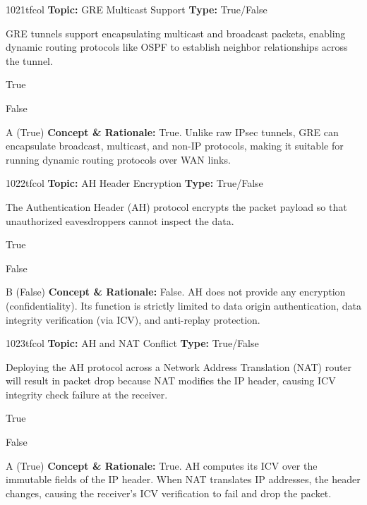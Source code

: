 \begin{qcard}{1021}{tfcol}
\textcolor{darkslate!75}{\small\textbf{Topic:} GRE Multicast Support \hfill \textbf{Type:} True/False}\vspace{0.4em}\par
GRE tunnels support encapsulating multicast and broadcast packets, enabling dynamic routing protocols like OSPF to establish neighbor relationships across the tunnel.
\begin{qoptions}
\item True
\item False
\end{qoptions}
\end{qcard}
\nopagebreak
\begin{explainbox}{A (True)}
\textbf{Concept \& Rationale:} True. Unlike raw IPsec tunnels, GRE can encapsulate broadcast, multicast, and non-IP protocols, making it suitable for running dynamic routing protocols over WAN links.
\end{explainbox}

\begin{qcard}{1022}{tfcol}
\textcolor{darkslate!75}{\small\textbf{Topic:} AH Header Encryption \hfill \textbf{Type:} True/False}\vspace{0.4em}\par
The Authentication Header (AH) protocol encrypts the packet payload so that unauthorized eavesdroppers cannot inspect the data.
\begin{qoptions}
\item True
\item False
\end{qoptions}
\end{qcard}
\nopagebreak
\begin{explainbox}{B (False)}
\textbf{Concept \& Rationale:} False. AH does not provide any encryption (confidentiality). Its function is strictly limited to data origin authentication, data integrity verification (via ICV), and anti-replay protection.
\end{explainbox}

\begin{qcard}{1023}{tfcol}
\textcolor{darkslate!75}{\small\textbf{Topic:} AH and NAT Conflict \hfill \textbf{Type:} True/False}\vspace{0.4em}\par
Deploying the AH protocol across a Network Address Translation (NAT) router will result in packet drop because NAT modifies the IP header, causing ICV integrity check failure at the receiver.
\begin{qoptions}
\item True
\item False
\end{qoptions}
\end{qcard}
\nopagebreak
\begin{explainbox}{A (True)}
\textbf{Concept \& Rationale:} True. AH computes its ICV over the immutable fields of the IP header. When NAT translates IP addresses, the header changes, causing the receiver's ICV verification to fail and drop the packet.
\end{explainbox}

